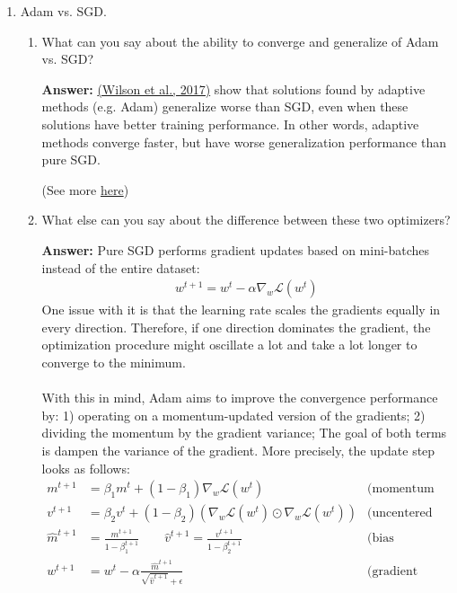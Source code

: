 \documentclass{article}
\newenvironment{QandA}{\begin{enumerate}[label=\arabic*.]}{\end{enumerate}}
\newenvironment{InnerQandA}{\begin{enumerate}[label=\roman*.]}{\end{enumerate}}
\newenvironment{answer}{\par\normalfont \textbf{Answer:}}{}
\begin{document}
\begin{QandA}
\begin{answer}
        (See more \href{https://towardsdatascience.com/learning-parameters-part-5-65a2f3583f7d}{here})
    \end{answer}

    \item Adam vs. SGD.
    \begin{InnerQandA}
        \item What can you say about the ability to converge and generalize of Adam vs. SGD?
        \begin{answer}
            \href{https://arxiv.org/abs/1705.08292}{(Wilson et al., 2017)} show that solutions found by adaptive methods (e.g. Adam) generalize worse than SGD, even when these solutions have better training performance. In other words, adaptive methods converge faster, but have worse generalization performance than pure SGD. 

            (See more \href{https://shaoanlu.wordpress.com/2017/05/29/sgd-all-which-one-is-the-best-optimizer-dogs-vs-cats-toy-experiment/}{here})
        \end{answer}

        \item What else can you say about the difference between these two optimizers?
        \begin{answer}
            Pure SGD performs gradient updates based on mini-batches instead of the entire dataset:
            \begin{align*}
                w^{t+1} = w^t - \alpha \nabla_w \mathcal{L}(w^t)
            \end{align*}
            One issue with it is that the learning rate scales the gradients equally in every direction. Therefore, if one direction dominates the gradient, the optimization procedure might oscillate a lot and take a lot longer to converge to the minimum. \\\\
            With this in mind, Adam aims to improve the convergence performance by: 1) operating on a momentum-updated version of the gradients; 2) dividing the momentum by the gradient variance; The goal of both terms is dampen the variance of the gradient. More precisely, the update step looks as follows:
            \begin{align*}
                m^{t+1} &= \beta_1 m^t + (1-\beta_1)\nabla_w \mathcal{L}(w^t) &\text{(momentum gradient)} \\
                v^{t+1} &= \beta_2 v^{t} + (1-\beta_2)(\nabla_w \mathcal{L}(w^t) \odot \nabla_w \mathcal{L}(w^t)) &\text{(uncentered variance)}  \\
                \hat{m}^{t+1} &= \frac{m^{t+1}}{1 - \beta_1^{t+1}} \quad\quad \hat{v}^{t+1} = \frac{v^{t+1}}{1 - \beta_2^{t+1}} &\text{(bias correction)} \\
                w^{t+1} &= w^t - \alpha \frac{\hat{m}^{t+1}}{\sqrt{\hat{v}^{t+1}} + \epsilon} & \text{(gradient step)}
            \end{align*}
        \end{answer}
    \end{InnerQandA}


\end{QandA}
\end{document}
